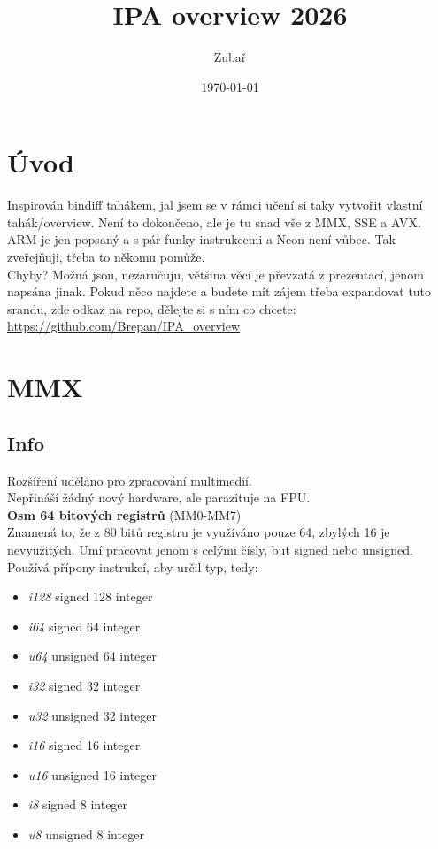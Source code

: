 \documentclass[
]{cz_sablona}
\title{IPA overview 2026}
\author{Zubař}
\date{\today}
\begin{document}
\maketitle

\thispagestyle{empty}
\section*{Úvod}
Inspirován bindiff tahákem, jal jsem se v rámci učení si taky vytvořit
vlastní tahák/overview. Není to dokončeno, ale je tu snad vše z
MMX, SSE a AVX. ARM je jen popsaný a s pár funky instrukcemi
a Neon není vůbec. Tak zveřejňuji, třeba to někomu pomůže.
\\[0.5em]
Chyby? Možná jsou, nezaručuju, většina věcí je převzatá z prezentací,
jenom napsána jinak. Pokud něco najdete a budete mít zájem třeba expandovat
tuto srandu, zde odkaz na repo, dělejte si s ním co chcete:
\url{https://github.com/Brepan/IPA_overview}

\newpage
\tableofcontents
\thispagestyle{empty}
\newpage
\section{MMX}
\subsection{Info}
Rozšíření uděláno pro zpracování multimedií.\\
Nepřináší žádný nový hardware, ale parazituje na FPU.\\[0.5em]
\textbf{Osm 64 bitových registrů} (MM0-MM7)\\[0.5em]
Znamená to, že z 80 bitů registru je využíváno pouze 64, zbylých 16 je nevyužitých.
Umí pracovat jenom s celými čísly, but signed nebo unsigned.\\

\noindent
Používá přípony instrukcí, aby určil typ, tedy:
\begin{itemize}
    \item \textit{i128} signed 128 integer
    \item \textit{i64} signed 64 integer
    \item \textit{u64} unsigned 64 integer
    \item \textit{i32} signed 32 integer
    \item \textit{u32} unsigned 32 integer
    \item \textit{i16} signed 16 integer
    \item \textit{u16} unsigned 16 integer
    \item \textit{i8} signed 8 integer
    \item \textit{u8} unsigned 8 integer
\end{itemize}
\end{document}

